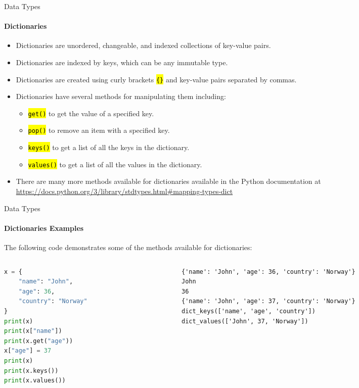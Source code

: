 \documentclass[
    aspectratio=169, 
    usepdftitle=false, 
    xcolor={dvipsnames},
    hyperref={
        colorlinks,
        linkcolor=black,
        urlcolor=blue}
    ]{beamer}
\let\OldTexttt\texttt
\renewcommand{\texttt}[1]{\OldTexttt{\hl{#1}}}%
\begin{document}
\begin{frame}[fragile]{Data Types}
    \framesubtitle{Dictionaries}
    \begin{itemize}
        \item Dictionaries are unordered, changeable, and indexed collections of key-value pairs.
        \item Dictionaries are indexed by keys, which can be any immutable type.
        \item Dictionaries are created using curly brackets \texttt{\{\}} and key-value pairs separated by commas.
        \item Dictionaries have several methods for manipulating them including:
              \begin{itemize}
                  \item \texttt{get()} to get the value of a specified key.
                  \item \texttt{pop()} to remove an item with a specified key.
                  \item \texttt{keys()} to get a list of all the keys in the dictionary.
                  \item \texttt{values()} to get a list of all the values in the dictionary.
              \end{itemize}
        \item There are many more methods available for dictionaries available in the Python documentation at \url{https://docs.python.org/3/library/stdtypes.html#mapping-types-dict}
    \end{itemize}
\end{frame}
\begin{frame}[fragile]{Data Types}
    \framesubtitle{Dictionaries Examples}
    The following code demonstrates some of the methods available for dictionaries:

    \begin{columns}
        \begin{column}{0.3\textwidth}
            \begin{lstlisting}[language=Python]
x = {
    "name": "John",
    "age": 36,
    "country": "Norway"
}
print(x)
print(x["name"])
print(x.get("age"))
x["age"] = 37
print(x)
print(x.keys())
print(x.values())
    \end{lstlisting}
        \end{column}
        \begin{column}{0.6\textwidth}
            \begin{lstlisting}[style=output]
{'name': 'John', 'age': 36, 'country': 'Norway'}
John
36
{'name': 'John', 'age': 37, 'country': 'Norway'}
dict_keys(['name', 'age', 'country'])
dict_values(['John', 37, 'Norway'])
\end{lstlisting}                  
        \end{column}
    \end{columns}
\end{frame}
\end{document}
